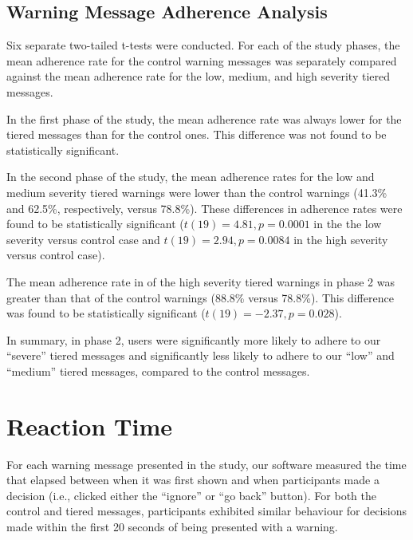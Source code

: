 \subsection{Warning Message Adherence Analysis}
Six separate two-tailed t-tests were conducted. For each of the study phases, the mean adherence rate for the control warning messages was separately compared against the mean adherence rate for the low, medium, and high severity tiered messages.

In the first phase of the study, the mean adherence rate was always lower for the tiered messages than for the control ones. This difference was not found to be statistically significant.

In the second phase of the study, the mean adherence rates for the low and medium severity tiered warnings were lower than the control warnings (41.3\% and 62.5\%, respectively, versus 78.8\%). These differences in adherence rates were found to be statistically significant ($t(19) = 4.81, p = 0.0001$ in the the low severity versus control case and $t(19) = 2.94, p = 0.0084$ in the high severity versus control case).

The mean adherence rate in of the high severity tiered warnings in phase 2 was greater than that of the control warnings (88.8\% versus 78.8\%). This difference was found to be statistically significant ($t(19) = -2.37, p = 0.028$).

In summary, in phase 2, users were significantly more likely to adhere to our ``severe'' tiered messages and significantly less likely to adhere to our ``low'' and ``medium'' tiered messages, compared to the control messages.


\section{Reaction Time}
For each warning message presented in the study, our software measured the time that elapsed between when it was first shown and when participants made a decision (i.e., clicked either the ``ignore'' or ``go back'' button). For both the control and tiered messages, participants exhibited similar behaviour for decisions made within the first 20 seconds of being presented with a warning.

